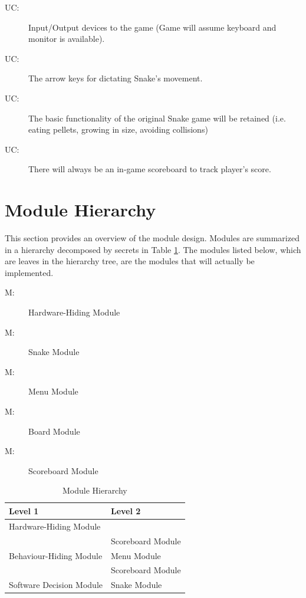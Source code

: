 \documentclass[12pt, titlepage]{article}
\newcounter{ucnum}
\newcommand{\uctheucnum}{UC\theucnum}
\newcounter{mnum}
\newcommand{\mthemnum}{M\themnum}
\begin{document}
\begin{description}
\item[ \uctheucnum \label{ucIO}:] Input/Output devices to the game (Game will assume keyboard and monitor is available).
\item[ \uctheucnum \label{ucInput}:] The arrow keys for dictating Snake's movement.
\item[ \uctheucnum \label{ucBasic}:] The basic functionality of the original Snake game will be retained (i.e. eating pellets, growing in size, avoiding collisions)
\item[ \uctheucnum \label{ucScore}:] There will always be an in-game scoreboard to track player's score.
\end{description}

\section{Module Hierarchy} \label{SecMH}

This section provides an overview of the module design. Modules are summarized
in a hierarchy decomposed by secrets in Table \ref{TblMH}. The modules listed
below, which are leaves in the hierarchy tree, are the modules that will
actually be implemented.

\begin{description}
\item [ \mthemnum \label{mHH}:] Hardware-Hiding Module
\item [ \mthemnum \label{mSM}:] Snake Module
\item [ \mthemnum \label{mMM}:] Menu Module
\item [ \mthemnum \label{mBM}:] Board Module
\item [ \mthemnum \label{mSBM}:] Scoreboard Module
\end{description}


\begin{table}[h!]
\centering
\begin{tabular}{p{} p{}}
\toprule
\textbf{Level 1} & \textbf{Level 2}\\
\midrule

{Hardware-Hiding Module} & ~ \\
\midrule

\multirow{3}{0.3\textwidth}{Behaviour-Hiding Module} & Scoreboard Module\\
& Menu Module\\
& Scoreboard Module\\
\midrule

\multirow{1}{0.3\textwidth}{Software Decision Module} & {Snake Module}\\
\bottomrule

\end{tabular}
\caption{Module Hierarchy}
\label{TblMH}
\end{table}
\end{document}
